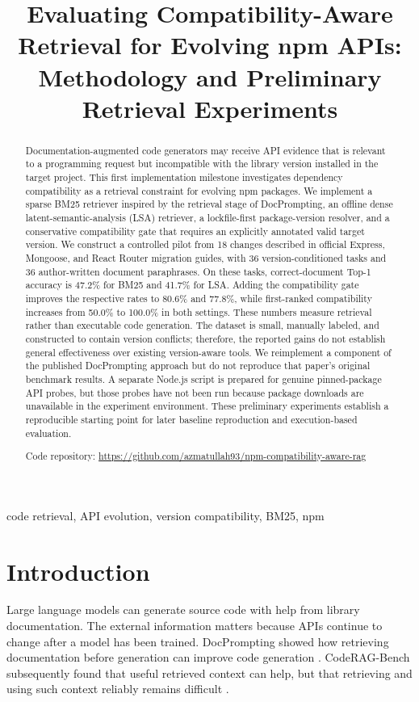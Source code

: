 \documentclass[conference]{IEEEtran}
\title{Evaluating Compatibility-Aware Retrieval for Evolving npm APIs: Methodology and Preliminary Retrieval Experiments}
\author{\IEEEauthorblockN{Azmat Ullah}
\IEEEauthorblockA{Research Methodology, FAST-NUCES, Pakistan\\
Registration No.: 26i-7841\\
Email: \texttt{\detokenize{i267841@isb.nu.edu.pk}}}}
\begin{document}
\maketitle

\begin{abstract}
Documentation-augmented code generators may receive API evidence that is relevant to a programming request but incompatible with the library version installed in the target project. This first implementation milestone investigates dependency compatibility as a retrieval constraint for evolving npm packages. We implement a sparse BM25 retriever inspired by the retrieval stage of DocPrompting, an offline dense latent-semantic-analysis (LSA) retriever, a lockfile-first package-version resolver, and a conservative compatibility gate that requires an explicitly annotated valid target version. We construct a controlled pilot from 18 changes described in official Express, Mongoose, and React Router migration guides, with 36 version-conditioned tasks and 36 author-written document paraphrases. On these tasks, correct-document Top-1 accuracy is 47.2\% for BM25 and 41.7\% for LSA. Adding the compatibility gate improves the respective rates to 80.6\% and 77.8\%, while first-ranked compatibility increases from 50.0\% to 100.0\% in both settings. These numbers measure retrieval rather than executable code generation. The dataset is small, manually labeled, and constructed to contain version conflicts; therefore, the reported gains do not establish general effectiveness over existing version-aware tools. We reimplement a component of the published DocPrompting approach but do not reproduce that paper's original benchmark results. A separate Node.js script is prepared for genuine pinned-package API probes, but those probes have not been run because package downloads are unavailable in the experiment environment. These preliminary experiments establish a reproducible starting point for later baseline reproduction and execution-based evaluation.
\par\noindent Code repository: \url{https://github.com/azmatullah93/npm-compatibility-aware-rag}
\end{abstract}

\begin{IEEEkeywords}
code retrieval, API evolution, version compatibility, BM25, npm
\end{IEEEkeywords}

\section{Introduction}
Large language models can generate source code with help from library documentation. The external information matters because APIs continue to change after a model has been trained. DocPrompting showed how retrieving documentation before generation can improve code generation \cite{docprompting}. CodeRAG-Bench subsequently found that useful retrieved context can help, but that retrieving and using such context reliably remains difficult \cite{coderag}.
\end{document}
